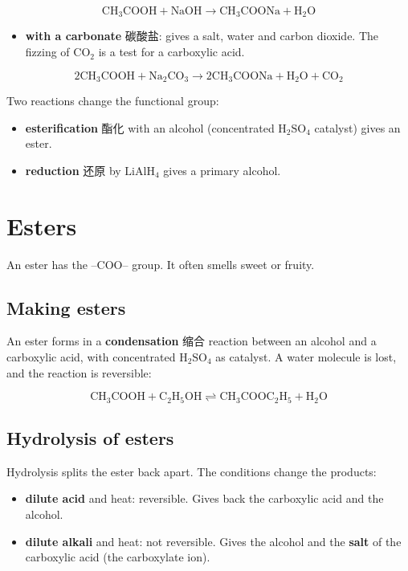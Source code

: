 \documentclass[11pt]{article}
\begin{document}
\[
\text{CH}_3\text{COOH} + \text{NaOH} \rightarrow \text{CH}_3\text{COONa} + \text{H}_2\text{O}
\]

\begin{itemize}
\item \textbf{with a carbonate} 碳酸盐: gives a salt, water and carbon dioxide. The fizzing of $\text{CO}_2$ is a test for a carboxylic acid.

\end{itemize}

\[
2\text{CH}_3\text{COOH} + \text{Na}_2\text{CO}_3 \rightarrow 2\text{CH}_3\text{COONa} + \text{H}_2\text{O} + \text{CO}_2
\]

Two reactions change the functional group:

\begin{itemize}
\item \textbf{esterification} 酯化 with an alcohol (concentrated $\text{H}_2\text{SO}_4$ catalyst) gives an ester.

\item \textbf{reduction} 还原 by $\text{LiAlH}_4$ gives a primary alcohol.

\end{itemize}

\section*{Esters}

An ester has the $\text{–COO–}$ group. It often smells sweet or fruity.

\subsection*{Making esters}

An ester forms in a \textbf{condensation} 缩合 reaction between an alcohol and a carboxylic acid, with concentrated $\text{H}_2\text{SO}_4$ as catalyst. A water molecule is lost, and the reaction is reversible:

\[
\text{CH}_3\text{COOH} + \text{C}_2\text{H}_5\text{OH} \rightleftharpoons \text{CH}_3\text{COOC}_2\text{H}_5 + \text{H}_2\text{O}
\]

\subsection*{Hydrolysis of esters}

Hydrolysis splits the ester back apart. The conditions change the products:

\begin{itemize}
\item \textbf{dilute acid} and heat: reversible. Gives back the carboxylic acid and the alcohol.

\item \textbf{dilute alkali} and heat: not reversible. Gives the alcohol and the \textbf{salt} of the carboxylic acid (the carboxylate ion).

\end{itemize}
\end{document}
